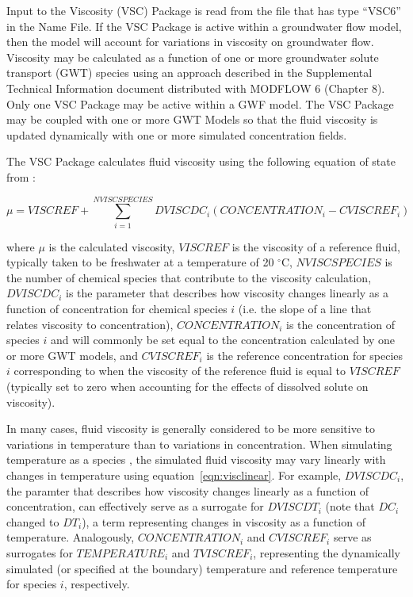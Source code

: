 Input to the Viscosity (VSC) Package is read from the file that has type ``VSC6'' in the Name File.  If the VSC Package is active within a groundwater flow model, then the model will account for variations in viscosity on groundwater flow.  Viscosity may be calculated as a function of one or more groundwater solute transport (GWT) species using an approach described in the Supplemental Technical Information document distributed with MODFLOW 6 (Chapter 8).  Only one VSC Package may be active within a GWF model. The VSC Package may be coupled with one or more GWT Models so that the fluid viscosity is updated dynamically with one or more simulated concentration fields.

The VSC Package calculates fluid viscosity using the following equation of state from \cite{langevin2008seawat}:

\begin{equation}
\label{eqn:visclinear}
\mu = VISCREF + \sum_{i=1}^{NVISCSPECIES} DVISCDC_i \left ( CONCENTRATION_i - CVISCREF_i \right )
\end{equation}

\noindent where $\mu$ is the calculated viscosity, $VISCREF$ is the viscosity of a reference fluid, typically taken to be freshwater at a temperature of 20 $^{\circ}$C, $NVISCSPECIES$ is the number of chemical species that contribute to the viscosity calculation, $DVISCDC_i$ is the parameter that describes how viscosity changes linearly as a function of concentration for chemical species $i$ (i.e. the slope of a line that relates viscosity to concentration), $CONCENTRATION_i$ is the concentration of species $i$ and will commonly be set equal to the concentration calculated by one or more GWT models, and $CVISCREF_i$ is the reference concentration for species $i$ corresponding to when the viscosity of the reference fluid is equal to $VISCREF$ (typically set to zero when accounting for the effects of dissolved solute on viscosity).

In many cases, fluid viscosity is generally considered to be more sensitive to variations in temperature than to variations in concentration.  When simulating temperature as a species \citep{zheng2010supplemental}, the simulated fluid viscosity may vary linearly with changes in temperature using equation~\ref{eqn:visclinear}.  For example, $DVISCDC_i$, the paramter that describes how viscosity changes linearly as a function of concentration, can effectively serve as a surrogate for $DVISCDT_i$ (note that $DC_i$ changed to $DT_i$), a term representing changes in viscosity as a function of temperature.  Analogously, $CONCENTRATION_i$ and $CVISCREF_i$ serve as surrogates for $TEMPERATURE_i$ and $TVISCREF_i$, representing the dynamically simulated (or specified at the boundary) temperature and reference temperature for species $i$, respectively.  

